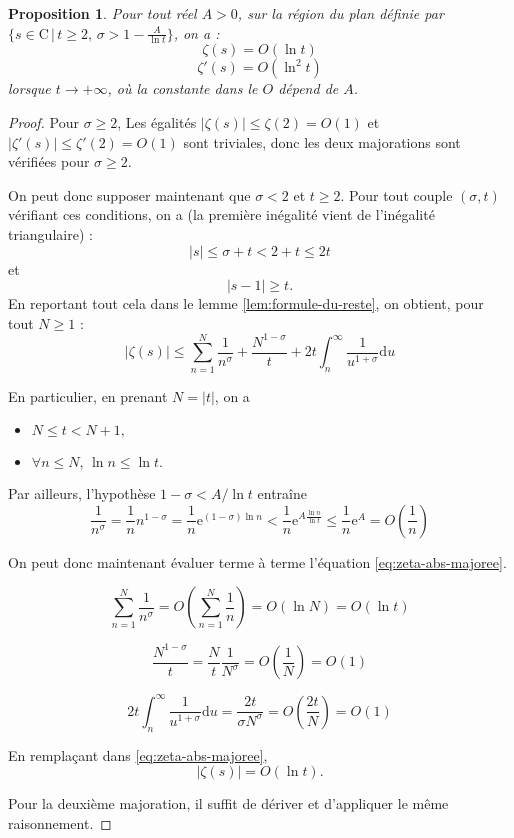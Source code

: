 \documentclass[french]{report}
\newtheorem{proposition}[theorem]{Proposition}
\begin{document}
\begin{proposition}\label{prop:majoration-zeta-et-zeta-prime}
  Pour tout réel $A>0$, sur la région du plan définie par $\{s\in\mathrm{C}\,|\,t\geq2,\,\sigma>1-\frac{A}{\ln t}\}$, on a :
  \[ \zeta(s) = O(\ln t) \]
  \[ \zeta'(s) = O(\ln^2 t) \]
  lorsque $t\rightarrow+\infty$, où la constante dans le $O$ dépend de $A$.
\end{proposition}

\begin{proof}
  Pour $\sigma\geq2$, Les égalités $|\zeta(s)|\leq\zeta(2)=O(1)$ et $|\zeta'(s)|\leq\zeta'(2)=O(1)$ sont triviales, donc les deux majorations sont vérifiées pour $\sigma\geq2$.

  On peut donc supposer maintenant que $\sigma<2$ et $t\geq2$. Pour tout couple $(\sigma, t)$ vérifiant ces conditions, on a (la première inégalité vient de l'inégalité triangulaire) :
  \[ |s|\leq\sigma+t<2+t\leq 2t \]
  et
  \[ |s-1|\geq t. \]
  En reportant tout cela dans le lemme \ref{lem:formule-du-reste}, on obtient, pour tout $N\geq1$ :
  \begin{equation}\label{eq:zeta-abs-majoree}
    |\zeta(s)|\leq\sum_{n=1}^N\frac{1}{n^\sigma}
    + \frac{N^{1-\sigma}}{t}
    + 2t\int_n^\infty\frac{1}{u^{1+\sigma}}\mathrm{d}u
  \end{equation}
 
  En particulier, en prenant $N=|t|$, on a
  \begin{itemize}
    \item $N\leq t<N+1,$
    \item $\forall n\leq N,\,\ln n\leq\ln t.$
  \end{itemize}

  Par ailleurs, l'hypothèse $1-\sigma<A/\ln t$ entraîne
  \[
    \frac{1}{n^\sigma}
    = \frac{1}{n}n^{1-\sigma}
    = \frac{1}{n}\mathrm{e}^{(1-\sigma)\ln n}
    < \frac{1}{n}\mathrm{e}^{A\frac{\ln n}{\ln t}}
    \leq \frac{1}{n}\mathrm{e}^A
    = O\left(\frac{1}{n}\right)
  \]

  On peut donc maintenant évaluer terme à terme l'équation \ref{eq:zeta-abs-majoree}.

  \[
    \sum_{n=1}^N\frac{1}{n^\sigma}
    = O\left(\sum_{n=1}^N\frac{1}{n}\right)
    = O(\ln N)
    = O(\ln t)
  \]

  \[
    \frac{N^{1-\sigma}}{t}
    = \frac{N}{t}\frac{1}{N^\sigma}
    = O\left(\frac{1}{N}\right)
    = O(1)
  \]

  \[
    2t\int_n^\infty\frac{1}{u^{1+\sigma}}\mathrm{d}u
    = \frac{2t}{\sigma N^\sigma}
    = O\left(\frac{2t}{N}\right)
    = O(1)
  \]

  En remplaçant dans \ref{eq:zeta-abs-majoree},
  \[ |\zeta(s)|=O(\ln t). \]

  Pour la deuxième majoration, il suffit de dériver et d'appliquer le même raisonnement.
\end{proof}
\end{document}
